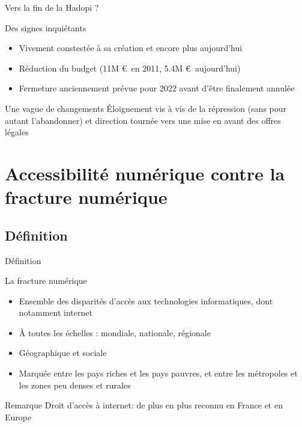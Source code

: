 \documentclass{beamer}
\begin{document}
\begin{frame}{Vers la fin de la Hadopi ?}
\begin{block}{Des signes inquiétants}
    \begin{itemize}
        \item Vivement constestée à sa création et encore plus aujourd'hui
        \item Réduction du budget (11M \euro ~en 2011, 5.4M \euro ~aujourd'hui)
        \item Fermeture anciennement prévue pour 2022 avant d'être finalement annulée
    \end{itemize}
\end{block}

    \begin{block}{Une vague de changements}
    Éloignement vis à vis de la répression (sans pour autant l'abandonner) et direction tournée vers une mise en avant des offres légales
    \end{block}
  
\end{frame}

\section{Accessibilité numérique contre la fracture numérique}
\subsection{Définition}
\begin{frame}{Définition}
    \begin{block}{La fracture numérique}
        \begin{itemize}
            \item Ensemble des disparités d'accès aux technologies informatiques, dont notamment internet
            \item À toutes les échelles : mondiale, nationale, régionale
            \item Géographique et sociale
            \item Marquée entre les pays riches et les pays pauvres, et entre les métropoles et les zones peu denses et rurales
        \end{itemize}
    
    \end{block}
    \begin{alertblock}{Remarque}
    Droit d'accès à internet: de plus en plus reconnu en France et en Europe
    
    \end{alertblock}
  
\end{frame}
\end{document}
